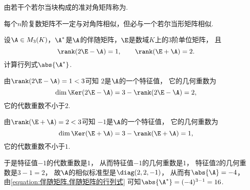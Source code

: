\begin{definition}
由若干个若尔当块构成的准对角矩阵称为.
\end{definition}

\begin{theorem}
每个\(n\)阶复数矩阵不一定与对角阵相似，但必与一个若尔当形矩阵相似.
\end{theorem}

\begin{example}
设\(\A \in M_3(K)\)，\(\A^*\)是\(\A\)的伴随矩阵，\(\E\)是数域\(K\)上的3阶单位矩阵，
且\[
	\rank(2\E-\A) = 1,
	\qquad
	\rank(\E+\A) = 2.
\]
计算行列式\(\abs{\A^*}\).
\begin{solution}
由\(\rank(2\E-\A) = 1 < 3\)可知
\(2\)是\(\A\)的一个特征值，
它的几何重数为\[
	\dim\Ker(2\E-\A)
	= 3 - \rank(2\E-\A)
	= 2,
\]
它的代数重数不小于\(2\).

由\(\rank(\E+\A) = 2 < 3\)可知
\(-1\)是\(\A\)的一个特征值，
它的几何重数为\[
	\dim\Ker(\E+\A)
	= 3 - \rank(\E+\A)
	= 1,
\]
它的代数重数不小于\(1\).

于是特征值\(-1\)的代数重数是\(1\)，
从而特征值\(-1\)的几何重数是\(1\)，
特征值\(2\)的几何重数是\(3-1=2\)，
故\(\A\)的相似标准型是\(\diag(2,2,-1)\)，
从而有\(\abs{\A} = -4\)，
由\cref{equation:伴随矩阵.伴随矩阵的行列式}
可知\(\abs{\A^*} = (-4)^{3-1} = 16\).
\end{solution}
\end{example}
